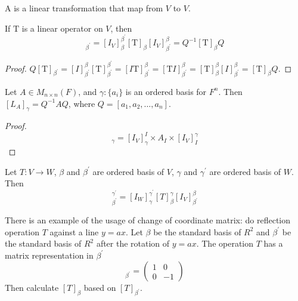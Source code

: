 \begin{definition}
	A  is a linear transformation that map from $V$ to $V$.
\end{definition}

\begin{theorem}\label{twoindextransform}
	If $\mathrm{T}$ is a linear operator on $V$, then
	\begin{equation}
		[\mathrm{T}]_{\beta^\prime} = [I_V]_{\beta}^{\beta^\prime} [\mathrm{T}]_\beta [I_V]_{\beta^\prime}^\beta= Q^{-1} [\mathrm{T}]_\beta Q 
	\end{equation}
\end{theorem}

\begin{proof}
    $Q [\mathrm{T}]_{\beta^\prime} = [I]_{\beta^\prime}^\beta [\mathrm{T}]_{\beta^\prime}^{\beta^\prime} = [I \mathrm{T}]_{\beta^\prime}^\beta = [\mathrm{T} I]_{\beta^\prime}^\beta = [\mathrm{T}]_\beta^\beta [I]_{\beta^\prime}^\beta = [\mathrm{T}]_\beta Q$.
\end{proof}

\begin{theorem}
    Let $A \in M_{n \times n} (F)$, and $\gamma:\{a_i\}$ is an ordered basis for $F^n$. Then $[L_A]_\gamma = Q^{-1} A Q$, where $Q = [a_1, a_2, \dots, a_n]$.
\end{theorem}

\begin{proof}
    \begin{equation*}
        [L_A]_\gamma = [I_V]_\gamma^I \times A_I \times [I_V]_I^\gamma
    \end{equation*}
\end{proof}


\begin{theorem} \label{specialchangeofcoordinates}
	Let $T:V\rightarrow W$, $\beta$ and $\beta^\prime$ are ordered basis of $V$, $\gamma$ and $\gamma^\prime$ are ordered basis of $W$. Then
	\begin{equation}
		[T]_{\beta^\prime}^{\gamma^\prime} = [I_W]_\gamma^{\gamma^\prime} [T]_\beta^\gamma [I_V]_{\beta^\prime}^\beta
	\end{equation}
\end{theorem}


There is an example of the usage of change of coordinate matrix: do reflection operation $T$ against a line $y = a x$. Let $\beta$ be the standard basis of $R^2$ and $\beta^\prime$ be the standard basis of $R^2$ after the rotation of $y = a x$. The operation $T$ has a matrix representation in $\beta^\prime$
	\begin{equation*}
		[T]_{\beta^\prime} = \begin{pmatrix}
			1 & 0 \\
			0 & -1
		\end{pmatrix}		
	\end{equation*}
	Then calculate $[T]_\beta$ based on $[T]_{\beta^\prime}$.
	



